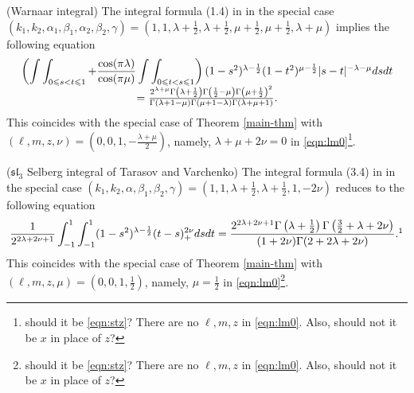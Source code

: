 \documentclass{article}
\numberwithin{equation}{section}
\newcommand{\comma}{{,}}
\begin{document}
\begin{example}
  \label{ex:2}(Warnaar integral) The integral formula (1.4) in
  {\cite{warnaar2010sl3}} in the special case $(k_1, k_2, \alpha_1, \beta_1,
  \alpha_2 \comma \beta_2, \gamma) = \left( 1, 1, \lambda + \frac{1}{2},
  \lambda + \frac{1}{2}, \mu + \frac{1}{2}, \mu + \frac{1}{2} \comma \lambda +
  \mu \right)$ implies the following equation
  \begin{equation*}
      \begin{array}[]{c}
     \left( \displaystyle\int \displaystyle\int_{0 \leqslant s < t
    \leqslant 1} + \frac{\cos (\pi \lambda)}{\cos (\pi \mu)} \displaystyle\int \displaystyle\int_{0
    \leqslant t < s \leqslant 1} \right) (1 - s^2)^{\lambda - \frac{1}{2}} (1
    - t^2)^{\mu - \frac{1}{2}} | s - t |^{- \lambda - \mu} d s d t
    \\
    = \frac{{2^{\lambda + \mu}}\Gamma \left( \lambda + \frac{1}{2} \right) \Gamma \left(
    \frac{1}{2} - \mu \right) \Gamma \left( \mu + \frac{1}{2}
    \right)^2}{\Gamma (\lambda + 1 - \mu) \Gamma (\mu + 1 - \lambda) \Gamma
    (\lambda + \mu + 1)}.
      \end{array}
  \end{equation*}
  This coincides with the special case of Theorem \ref{main-thm} with $(\ell,
  m, z, \nu) = \left( 0, 0, 1, - \frac{\lambda + \mu}{2} \right)$, namely,
  $\lambda+\mu+2\nu=0$ in
  \eqref{eqn:lm0}\footnote{should it 
      be \eqref{eqn:stz}? There are no $\ell,m,z$ in \eqref{eqn:lm0}. Also, should not it be $x$ in place of $z$?}.
\end{example}

\begin{example}
  \label{ex:3}($\mathfrak{s}\mathfrak{l}_3$ Selberg integral of Tarasov and
  Varchenko) The integral formula (3.4) in {\cite{tarasov2003selberg}} in the
  special case $(k_1, k_2, \alpha, \beta_1, \beta_2, \gamma) = \left( 1, 1,
  \lambda + \frac{1}{2}, \lambda + \frac{1}{2}, 1, - 2 \nu \right)$ reduces to
  the following equation
  \begin{equation*}
    \frac{1}{2^{2 \lambda + 2 \nu + 1}} \displaystyle\displaystyle\int_{- 1}^1 \displaystyle\int_{- 1}^1 (1 -
    s^2)^{\lambda - \frac{1}{2}} (t - s)_+^{2 \nu} d s d t = \frac{2^{2\lambda+2\nu+1}\Gamma
    \left( \lambda + \frac{1}{2} \right) \Gamma \left( \frac{3}{2} + \lambda +
2 \nu \right)}{(1 + 2 \nu) \Gamma (2 + 2 \lambda + 2 \nu)} \mbox{.\footnotemark}
  \end{equation*}
  This coincides with the special case of Theorem \ref{main-thm} with $(\ell,
  m, z, \mu) = \left( 0, 0, 1, \frac{1}{2} \right)$, namely, $\mu=\frac{1}{2}$ in \eqref{eqn:lm0}\footnote{should it 
      be \eqref{eqn:stz}? There are no $\ell,m,z$ in \eqref{eqn:lm0}. Also, should not it be $x$ in place of $z$?}.
\end{example}
\end{document}
